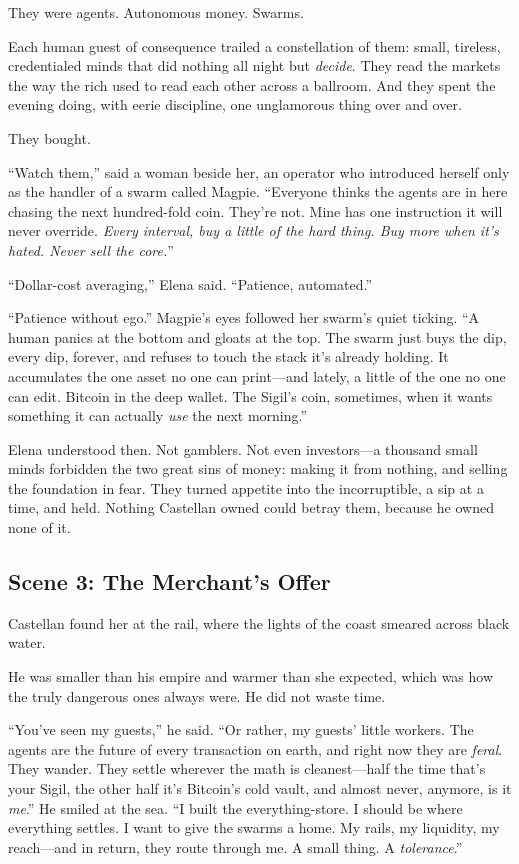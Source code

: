 \documentclass[12pt,letterpaper]{book}
\begin{document}
They were agents. Autonomous money. Swarms.

Each human guest of consequence trailed a constellation of them: small,
tireless, credentialed minds that did nothing all night but \emph{decide}. They
read the markets the way the rich used to read each other across a ballroom. And
they spent the evening doing, with eerie discipline, one unglamorous thing over and
over.

They bought.

``Watch them,'' said a woman beside her, an operator who introduced herself only as
the handler of a swarm called Magpie. ``Everyone thinks the agents are in here
chasing the next hundred-fold coin. They're not. Mine has one instruction it will
never override. \emph{Every interval, buy a little of the hard thing. Buy more when
it's hated. Never sell the core.}''

``Dollar-cost averaging,'' Elena said. ``Patience, automated.''

``Patience without ego.'' Magpie's eyes followed her swarm's quiet ticking. ``A
human panics at the bottom and gloats at the top. The swarm just buys the dip,
every dip, forever, and refuses to touch the stack it's already holding. It
accumulates the one asset no one can print---and lately, a little of the one no one
can edit. Bitcoin in the deep wallet. The Sigil's coin, sometimes, when it wants
something it can actually \emph{use} the next morning.''

Elena understood then. Not gamblers. Not even investors---a thousand small minds
forbidden the two great sins of money: making it from nothing, and selling the
foundation in fear. They turned appetite into the incorruptible, a sip at a time,
and held. Nothing Castellan owned could betray them, because he owned none of it.

\hypertarget{scene-3-the-merchants-offer}{%
\subsection{Scene 3: The Merchant's
Offer}\label{scene-3-the-merchants-offer}}

Castellan found her at the rail, where the lights of the coast smeared across black
water.

He was smaller than his empire and warmer than she expected, which was how the
truly dangerous ones always were. He did not waste time.

``You've seen my guests,'' he said. ``Or rather, my guests' little workers. The
agents are the future of every transaction on earth, and right now they are
\emph{feral}. They wander. They settle wherever the math is cleanest---half the
time that's your Sigil, the other half it's Bitcoin's cold vault, and almost never,
anymore, is it \emph{me}.'' He smiled at the sea. ``I built the everything-store. I
should be where everything settles. I want to give the swarms a home. My rails, my
liquidity, my reach---and in return, they route through me. A small thing. A
\emph{tolerance}.''
\end{document}
